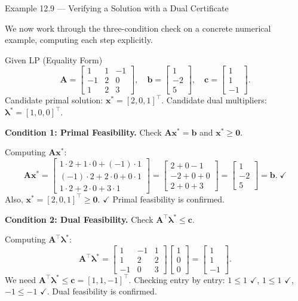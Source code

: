 \documentclass[aspectratio=169,10pt]{beamer}
\newcommand{\xv}{\mathbf{x}}
\newcommand{\cv}{\mathbf{c}}
\newcommand{\bv}{\mathbf{b}}
\newcommand{\Av}{\mathbf{A}}
\newcommand{\lav}{\boldsymbol{\lambda}}
\begin{document}
\begin{frame}[allowframebreaks]{Example 12.9 --- Verifying a Solution with a Dual Certificate}

We now work through the three-condition check on a concrete numerical example,
computing each step explicitly.

\begin{exampleblock}{Given LP (Equality Form)}
\[
  \Av = \begin{bmatrix}1&1&-1\\-1&2&0\\1&2&3\end{bmatrix},\quad
  \bv = \begin{bmatrix}1\\-2\\5\end{bmatrix},\quad
  \cv = \begin{bmatrix}1\\1\\-1\end{bmatrix}.
\]
Candidate primal solution: $\xv^* = [2,0,1]^\top$.
Candidate dual multipliers: $\lav^* = [1,0,0]^\top$.
\end{exampleblock}

\textbf{Condition 1: Primal Feasibility.}
Check $\Av\xv^* = \bv$ and $\xv^* \ge \mathbf{0}$.

Computing $\Av\xv^*$:
\[
  \Av\xv^* = \begin{bmatrix}1\cdot2 + 1\cdot0 + (-1)\cdot1\\
  (-1)\cdot2 + 2\cdot0 + 0\cdot1\\
  1\cdot2 + 2\cdot0 + 3\cdot1\end{bmatrix}
  = \begin{bmatrix}2 + 0 - 1\\-2 + 0 + 0\\2 + 0 + 3\end{bmatrix}
  = \begin{bmatrix}1\\-2\\5\end{bmatrix} = \bv. \;\checkmark
\]
Also, $\xv^* = [2, 0, 1]^\top \ge \mathbf{0}$. $\checkmark$
Primal feasibility is confirmed.

\textbf{Condition 2: Dual Feasibility.}
Check $\Av^\top\lav^* \le \cv$.

Computing $\Av^\top\lav^*$:
\[
  \Av^\top\lav^* = \begin{bmatrix}1&-1&1\\1&2&2\\-1&0&3\end{bmatrix}
  \begin{bmatrix}1\\0\\0\end{bmatrix}
  = \begin{bmatrix}1\\1\\-1\end{bmatrix}.
\]
We need $\Av^\top\lav^* \le \cv = [1, 1, -1]^\top$.
Checking entry by entry: $1 \le 1$ $\checkmark$, $1 \le 1$ $\checkmark$,
$-1 \le -1$ $\checkmark$.  Dual feasibility is confirmed.


\end{frame}
\end{document}

